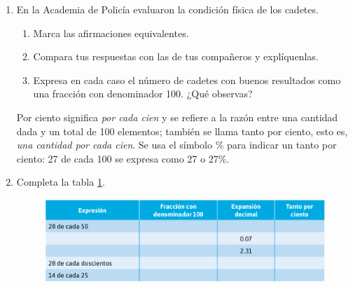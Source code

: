 \documentclass[11pt]{book}
\begin{document}
\begin{enumerate}
  \item En la Academia de Policía evaluaron la condición física de los cadetes.
        \begin{enumerate}
          \item Marca las afirmaciones equivalentes.\\
          \item Compara tus respuestas con las de tus compañeros y explíquenlas.
          \item Expresa en cada caso el número de cadetes con buenos resultados como una fracción con denominador 100. ¿Qué observas?
        \end{enumerate}

        \begin{boxH}
          Por ciento significa \emph{por cada cien} y se refiere a la razón entre una cantidad dada
          y un total de 100 elementos; también se llama tanto por ciento, esto es, \emph{una cantidad por cada cien}. Se usa el símbolo \% para indicar un tanto por ciento: 27 de
          cada 100 se expresa como 27 o 27\%.
        \end{boxH}

  \item Completa la tabla \ref{fig:tabla_tantoporciento}.

        \begin{figure}[H]
          \centering
          \includegraphics[width=0.7\linewidth]{tabla_tantoporciento.png}
          \label{fig:tabla_tantoporciento}
        \end{figure}


\end{enumerate}
\end{document}
